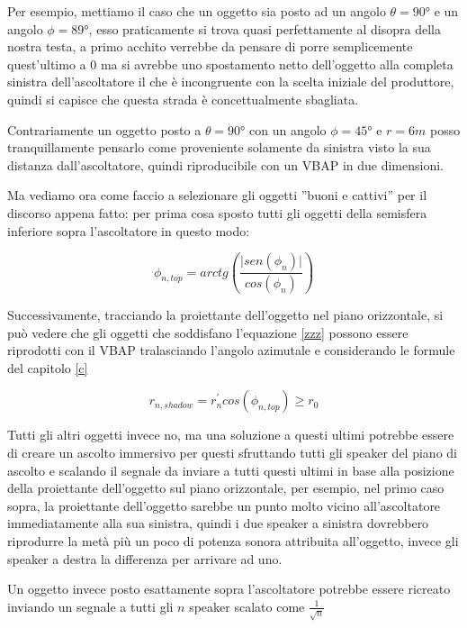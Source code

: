 \documentclass[12pt,a4paper]{report}
\begin{document}
Per esempio, mettiamo il caso che un oggetto sia posto ad un angolo $	\theta= 90° $ e un angolo $\phi=89°$, esso praticamente si trova quasi perfettamente al disopra della nostra testa, a primo acchito verrebbe da pensare di porre semplicemente quest'ultimo a $0$ ma si avrebbe uno spostamento netto dell'oggetto alla completa sinistra dell'ascoltatore il che è incongruente con la scelta iniziale del produttore, quindi si capisce che questa strada è concettualmente sbagliata.

Contrariamente un oggetto posto a $	\theta= 90° $ con un angolo $\phi=45°$ e $r=6m$ posso tranquillamente pensarlo come proveniente solamente da sinistra visto la sua distanza dall'ascoltatore, quindi riproducibile con un VBAP in due dimensioni.

Ma vediamo ora come faccio a selezionare gli oggetti ''buoni e cattivi'' per il discorso appena fatto: per prima cosa sposto tutti gli oggetti della semisfera inferiore sopra l'ascoltatore in questo modo:

\begin{equation}
\phi_{n,top} = arctg  \left( \dfrac{\vert sen(\phi_n) \vert}{ cos(\phi_n) } \right)
\label{  b}
\end{equation}

Successivamente, tracciando la proiettante dell'oggetto nel piano orizzontale, si può vedere che gli oggetti che soddisfano l'equazione \ref{zzz} possono essere riprodotti con il VBAP tralasciando l'angolo azimutale e considerando le formule del capitolo \ref{c}

\begin{equation}
r_{n,shadow}=r_n^{\prime} cos(\phi_{n,top}) \geq r_0
\label{zzz}
\end{equation}

Tutti gli altri oggetti invece no, ma una soluzione a questi ultimi potrebbe essere di creare un ascolto immersivo per questi sfruttando tutti gli speaker del piano di ascolto e scalando il segnale da inviare a tutti questi ultimi in base alla posizione della proiettante dell'oggetto sul piano orizzontale, per esempio, nel primo caso sopra, la proiettante dell'oggetto sarebbe un punto molto vicino all'ascoltatore immediatamente alla sua sinistra, quindi i due speaker a sinistra dovrebbero riprodurre la metà più un poco di potenza sonora attribuita all'oggetto, invece gli speaker a destra la differenza per arrivare ad uno.

Un oggetto invece posto esattamente sopra l'ascoltatore potrebbe essere ricreato inviando un segnale a tutti gli $n$ speaker scalato come $\frac{1}{\sqrt{n}}$
\end{document}
